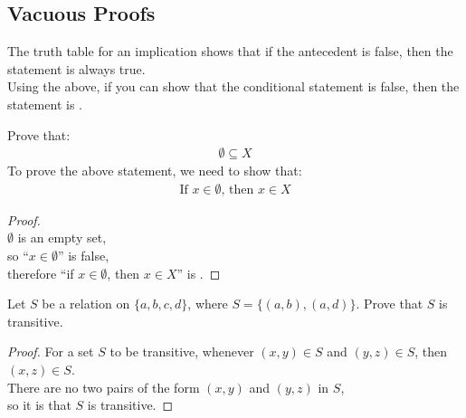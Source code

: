 \documentclass[../notes.tex]{subfiles}
\begin{document}
			\subsection{Vacuous Proofs}
				The truth table for an implication shows that if the antecedent is false, then the statement is always true.\\
				Using the above, if you can show that the conditional statement is false, then the statement is .
				\begin{example}[width=0.7\textwidth]
					Prove that:
					\begin{align*}
						\emptyset \subseteq X
					\end{align*}
					To prove the above statement, we need to show that:
						\begin{align*}
							\text{If } x \in \emptyset \text{, then } x \in X
						\end{align*}
					\begin{proof}
						$ $\\
						$\emptyset$ is an empty set,\\
						so ``$x \in \emptyset$'' is false,\\
						therefore ``if $x \in \emptyset$, then $x \in X$'' is .
					\end{proof}
				\end{example}
				\begin{example}
					Let $S$ be a relation on $\{a, b, c, d\}$, where $S = \bigl\{(a, b), (a, d)\bigr\}$. Prove that $S$ is transitive.
					\begin{proof} For a set $S$ to be transitive, whenever $(x, y) \in S$ and $(y, z) \in S$, then $(x, z) \in S$.\\
						There are no two pairs of the form $(x, y)$ and $(y, z)$ in $S$,\\
						so it is  that $S$ is transitive.
					\end{proof}
				\end{example}
\end{document}
